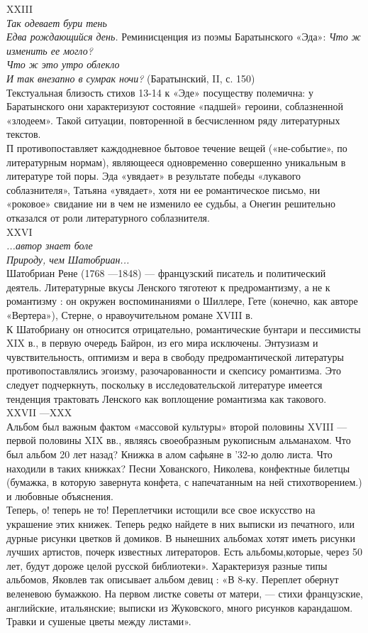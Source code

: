 XXIII\\
\emph{Так одевает бури тень\\
Едва рождающийся день.}
 Реминисценция из поэмы Баратынского «Эда»:
\emph{Что ж изменить ее могло?\\
Что ж это утро облекло\\
И так внезапно в сумрак ночи?} (Баратынский, II, с. 150)\\
Текстуальная близость стихов 13-14 к «Эде» посуществу полемична: у Баратынского они характеризуют состояние «падшей» героини, соблазненной «злодеем». Такой ситуации, повторенной в бесчисленном ряду литературных текстов.\\
П противопоставляет каждодневное бытовое течение вещей («не-событие», по литературным нормам), являющееся одновременно совершенно уникальным в литературе той поры.
Эда «увядает» в результате победы «лукавого соблазнителя», Татьяна «увядает», хотя ни ее романтическое письмо, ни «роковое» свидание ни в чем не изменило ее судьбы, а Онегин решительно отказался от роли литературного соблазнителя.\\
XXVI\\
\emph{...автор знает боле\\
Природу, чем Шатобриан... }\\
Шатобриан Рене (1768 —1848) — французский писатель и политический деятель. 
Литературные вкусы Ленского тяготеют к предромантизму, а не к романтизму : он окружен воспоминаниями о Шиллере, Гете (конечно, как авторе «Вертера»), Стерне, о нравоучительном романе XVIII в.\\
 К Шатобриану он относится отрицательно, романтические бунтари и пессимисты XIX в., в первую очередь Байрон, из его мира исключены. Энтузиазм и чувствительность, оптимизм и вера в свободу предромантической литературы противопоставлялись эгоизму, разочарованности и скепсису романтизма. Это следует подчеркнуть, поскольку в исследовательской литературе имеется тенденция трактовать Ленского как воплощение романтизма как такового.\\
 XXVII —XXX\\
 Альбом был важным фактом «массовой культуры» второй половины XVIII — первой половины XIX вв., являясь своеобразным рукописным альманахом. 
  Что был альбом 20 лет назад? Книжка в алом сафьяне в '32-ю долю листа. Что находили в таких книжках?
Песни Хованского, Николева, конфектные билетцы (бумажка, в которую завернута конфета, с напечатанным на ней стихотворением.) и любовные
объяснения. \\
Теперь, о! теперь не то! Переплетчики истощили все свое искусство на украшение этих книжек. Теперь редко найдете в них выписки из печатного, или дурные рисунки цветков й домиков. В нынешних альбомах хотят иметь рисунки лучших артистов, почерк известных литераторов. Есть альбомы,которые, через 50 лет, будут дороже целой русской библиотеки». Характеризуя разные типы альбомов, Яковлев так описывает альбом девиц : «В 8-ку. Переплет обернут веленевою бумажкою. На первом листке советы от матери, — стихи французские, английские, итальянские; выписки из Жуковского, много рисунков карандашом. Травки и сушеные цветы между листами».
